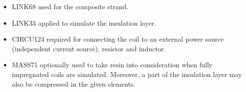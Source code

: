 \begin{itemize}
    \item LINK68 used for the composite strand.
    \item LINK33 applied to simulate the insulation layer. 
    \item CIRCU124 required for connecting the coil to an external power source (independent current source), resistor and inductor.
    \item MASS71 optionally used to take resin into consideration when fully impregnated coils are simulated. Moreover, a part of the insulation layer may also be compressed in the given elements.
\end{itemize}
